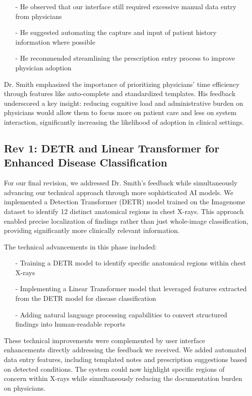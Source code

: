 \documentclass{article}
\begin{document}
\begin{itemize}
    \item[-] He observed that our interface still required excessive manual data entry from physicians
    \item[-] He suggested automating the capture and input of patient history information where possible
    \item[-] He recommended streamlining the prescription entry process to improve physician adoption
\end{itemize}

Dr. Smith emphasized the importance of prioritizing physicians' time efficiency through features like auto-complete and standardized templates. His feedback underscored a key insight: reducing cognitive load and administrative burden on physicians would allow them to focus more on patient care and less on system interaction, significantly increasing the likelihood of adoption in clinical settings.

\subsection{Rev 1: DETR and Linear Transformer for Enhanced Disease Classification}

For our final revision, we addressed Dr. Smith's feedback while simultaneously advancing our technical approach through more sophisticated AI models. We implemented a Detection Transformer (DETR) model trained on the Imagenome dataset to identify 12 distinct anatomical regions in chest X-rays. This approach enabled precise localization of findings rather than just whole-image classification, providing significantly more clinically relevant information.

The technical advancements in this phase included:

\begin{itemize}
    \item[-] Training a DETR model to identify specific anatomical regions within chest X-rays
    \item[-] Implementing a Linear Transformer model that leveraged features extracted from the DETR model for disease classification
    \item[-] Adding natural language processing capabilities to convert structured findings into human-readable reports
\end{itemize}

These technical improvements were complemented by user interface enhancements directly addressing the feedback we received. We added automated data entry features, including templated notes and prescription suggestions based on detected conditions. The system could now highlight specific regions of concern within X-rays while simultaneously reducing the documentation burden on physicians.
\end{document}
